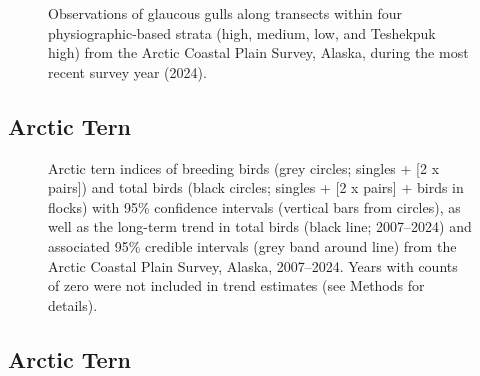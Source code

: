 \documentclass[
]{article}
\begin{document}
\begin{figure}


\caption{\label{fig-GLGUmap}Observations of glaucous gulls along
transects within four physiographic-based strata (high, medium, low, and
Teshekpuk high) from the Arctic Coastal Plain Survey, Alaska, during the
most recent survey year (2024).}

\end{figure}%

\newpage{}

\subsection*{Arctic Tern}\label{arctic-tern}

\begin{figure}


\caption{\label{fig-ARTE}Arctic tern indices of breeding birds (grey
circles; singles + {[}2 x pairs{]}) and total birds (black circles;
singles + {[}2 x pairs{]} + birds in flocks) with 95\% confidence
intervals (vertical bars from circles), as well as the long-term trend
in total birds (black line; 2007--2024) and associated 95\% credible
intervals (grey band around line) from the Arctic Coastal Plain Survey,
Alaska, 2007--2024. Years with counts of zero were not included in trend
estimates (see Methods for details).}

\end{figure}%

\newpage{}

\subsection*{Arctic Tern}\label{arctic-tern-1}

\begingroup\fontsize{10}{12}\selectfont
\end{document}
